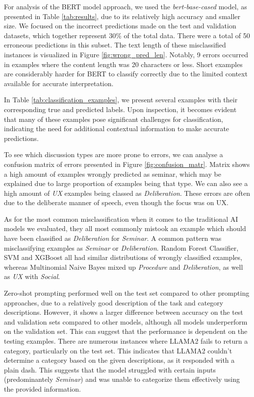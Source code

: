 \documentclass[fleqn,moreauthors,10pt]{ds_report}
\begin{document}
For analysis of the BERT model approach, we used the \textit{bert-base-cased} model, as presented in Table \ref{tab:results}, due to its relatively high accuracy and smaller size. We focused on the incorrect predictions made on the test and validation datasets, which together represent 30\% of the total data. There were a total of 50 erroneous predictions in this subset. The text length of these misclassified instances is visualized in Figure \ref{fig:wrong_pred_len}. Notably, 9 errors occurred in examples where the content length was 20 characters or less. Short examples are considerably harder for BERT to classify correctly due to the limited context available for accurate interpretation. 

In Table \ref{tab:classification_examples}, we present several examples with their corresponding true and predicted labels. Upon inspection, it becomes evident that many of these examples pose significant challenges for classification, indicating the need for additional contextual information to make accurate predictions.

To see which discussion types are more prone to errors, we can analyse a confusion matrix of errors presented in Figure \ref{fig:confusion_matr}. Matrix shows a high amount of examples wrongly predicted as seminar, which may be explained due to large proportion of examples being that type. We can also see a high amount of \textit{UX} examples being classed as \textit{Deliberation}. These errors are often due to the deliberate manner of speech, even though the focus was on UX.

As for the most common misclassification when it comes to the traditional AI models we evaluated, they all most commonly mistook an example which should have been classified as \textit{Deliberation} for \textit{Seminar}. A common pattern was misclassifying examples as \textit{Seminar} or \textit{Deliberation}. Random Forest Classifier, SVM and XGBoost all had similar distributions of wrongly classified examples, whereas Multinomial Naive Bayes mixed up \textit{Procedure} and \textit{Deliberation}, as well as \textit{UX} with \textit{Social}.

Zero-shot prompting performed well on the test set compared to other prompting approaches, due to a relatively good description of the task and category descriptions. However, it shows a larger difference between accuracy on the test and validation sets compared to other models, although all models underperform on the validation set. This can suggest that the performance is dependent on the testing examples. 
There are numerous instances where LLAMA2 fails to return a category, particularly on the test set. This indicates that LLAMA2 couldn't determine a category based on the given descriptions, as it responded with a plain dash. This suggests that the model struggled with certain inputs (predominantely \textit{Seminar}) and was unable to categorize them effectively using the provided information.
\end{document}
